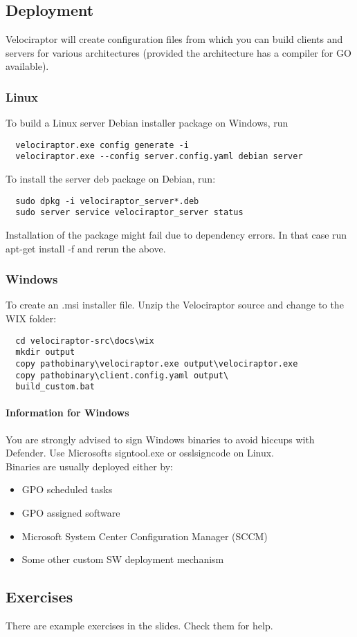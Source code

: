 \subsection{Deployment}
Velociraptor will create configuration files from which you can build clients and servers for various architectures (provided the architecture has a compiler for GO available).\\

\subsubsection{Linux}
To build a Linux server Debian installer package on Windows, run
\begin{lstlisting}
  velociraptor.exe config generate -i
  velociraptor.exe --config server.config.yaml debian server
\end{lstlisting}
To install the server deb package on Debian, run:
\begin{lstlisting}
  sudo dpkg -i velociraptor_server*.deb
  sudo server service velociraptor_server status
\end{lstlisting}
Installation of the package might fail due to dependency errors. In that case run apt-get install -f and rerun the above.

\subsubsection{Windows}
To create an .msi installer file. Unzip the Velociraptor source and change to the WIX folder:
\begin{lstlisting}
  cd velociraptor-src\docs\wix
  mkdir output
  copy pathobinary\velociraptor.exe output\velociraptor.exe
  copy pathobinary\client.config.yaml output\
  build_custom.bat
\end{lstlisting}

\paragraph{Information for Windows}
You are strongly advised to sign Windows binaries to avoid hiccups with Defender. Use Microsofts signtool.exe or osslsigncode on Linux.\\

Binaries are usually deployed either by:
\begin{itemize}
  \item GPO scheduled tasks
  \item GPO assigned software
  \item Microsoft System Center Configuration Manager (SCCM)
  \item Some other custom SW deployment mechanism
\end{itemize}

\subsection{Exercises}
There are example exercises in the slides. 
Check them for help.